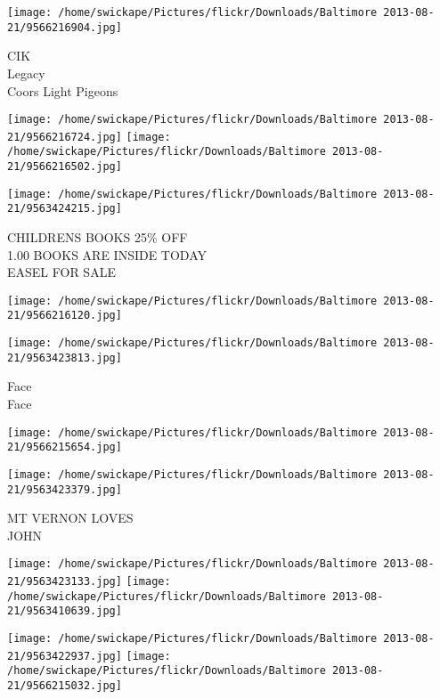 \documentclass[10pt,letterpaper]{article}
\begin{document}
\vspace{0.25in}
\texttt{[image: /home/swickape/Pictures/flickr/Downloads/Baltimore 2013-08-21/9566216904.jpg]}

CIK\\
Legacy\\
Coors Light Pigeons\\
\pagebreak

\texttt{[image: /home/swickape/Pictures/flickr/Downloads/Baltimore 2013-08-21/9566216724.jpg]}
\texttt{[image: /home/swickape/Pictures/flickr/Downloads/Baltimore 2013-08-21/9566216502.jpg]}

\texttt{[image: /home/swickape/Pictures/flickr/Downloads/Baltimore 2013-08-21/9563424215.jpg]}

CHILDRENS BOOKS 25\% OFF\\
1.00 BOOKS ARE INSIDE TODAY\\
EASEL FOR SALE\\
\pagebreak

\texttt{[image: /home/swickape/Pictures/flickr/Downloads/Baltimore 2013-08-21/9566216120.jpg]}

\vspace{0.25in}
\texttt{[image: /home/swickape/Pictures/flickr/Downloads/Baltimore 2013-08-21/9563423813.jpg]}

Face\\
Face\\
\pagebreak

\texttt{[image: /home/swickape/Pictures/flickr/Downloads/Baltimore 2013-08-21/9566215654.jpg]}

\vspace{0.25in}
\texttt{[image: /home/swickape/Pictures/flickr/Downloads/Baltimore 2013-08-21/9563423379.jpg]}

MT VERNON LOVES\\
JOHN\\
\pagebreak

\texttt{[image: /home/swickape/Pictures/flickr/Downloads/Baltimore 2013-08-21/9563423133.jpg]}
\texttt{[image: /home/swickape/Pictures/flickr/Downloads/Baltimore 2013-08-21/9563410639.jpg]}

\texttt{[image: /home/swickape/Pictures/flickr/Downloads/Baltimore 2013-08-21/9563422937.jpg]}
\texttt{[image: /home/swickape/Pictures/flickr/Downloads/Baltimore 2013-08-21/9566215032.jpg]}
\end{document}
